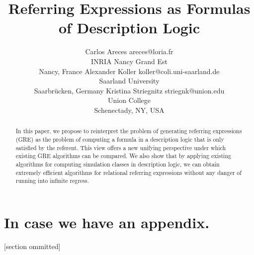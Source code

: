 \documentclass[11pt]{article}
\begin{document}
\title{Referring Expressions as Formulas of Description Logic}

\author{\name Carlos Areces \email areces@loria.fr \\
       \addr INRIA Nancy Grand Est\\
       Nancy, France
       \AND
       \name Alexander Koller \email koller@coli.uni-saarland.de \\
       \addr Saarland University\\
       Saarbr\"{u}cken, Germany
       \AND
       \name Kristina Striegnitz \email striegnk@union.edu \\
       \addr Union College\\
       Schenectady, NY, USA}


\maketitle


\begin{abstract}
In this paper, we propose to reinterpret the problem of generating
referring expressions (GRE) as the problem of computing a formula in a
description logic that is only satisfied by the referent. This view
offers a new unifying perspective under which existing GRE algorithms
can be compared. We also show that by applying existing algorithms for
computing simulation classes in description logic, we can obtain
extremely efficient algorithms for relational referring expressions
without any danger of running into infinite regress.
\end{abstract}














\appendix
\section*{In case we have an appendix.}

[section ommitted]



\vskip 0.2in


\end{document}
